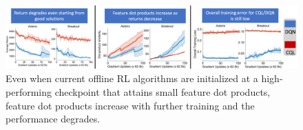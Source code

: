 \begin{figure}[t]
    \centering
    \includegraphics[width=0.99\linewidth]{chapters/dr3/figures_iclr/return_degrades.pdf}
    \vspace{-0.3cm}
    \caption{\small{Even when current offline RL algorithms are initialized at a high-performing checkpoint that attains small feature dot products, feature dot products increase with further training and the performance degrades.}}  
    \label{fig:stability}
    \vspace{-0.3cm}
\end{figure}



